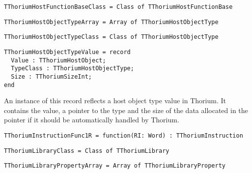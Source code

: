 \begin{verbatim}
TThoriumHostFunctionBaseClass = Class of TThoriumHostFunctionBase
\end{verbatim}
\label{thoriumcorepkg:thorium:tthoriumhostfunctionbaseclass}



\begin{verbatim}
TThoriumHostObjectTypeArray = Array of TThoriumHostObjectType
\end{verbatim}
\label{thoriumcorepkg:thorium:tthoriumhostobjecttypearray}



\begin{verbatim}
TThoriumHostObjectTypeClass = Class of TThoriumHostObjectType
\end{verbatim}
\label{thoriumcorepkg:thorium:tthoriumhostobjecttypeclass}



\begin{verbatim}
TThoriumHostObjectTypeValue = record
  Value : TThoriumHostObject;
  TypeClass : TThoriumHostObjectType;
  Size : TThoriumSizeInt;
end

\end{verbatim}
\label{thoriumcorepkg:thorium:tthoriumhostobjecttypevalue}
An instance of this record reflects a host object type value in Thorium. It contains the value, a pointer to the type and the size of the data allocated in the pointer if it should be automatically handled by Thorium.


\begin{verbatim}
TThoriumInstructionFunc1R = function(RI: Word) : TThoriumInstruction
\end{verbatim}
\label{thoriumcorepkg:thorium:tthoriuminstructionfunc1r}



\begin{verbatim}
TThoriumLibraryClass = Class of TThoriumLibrary
\end{verbatim}
\label{thoriumcorepkg:thorium:tthoriumlibraryclass}



\begin{verbatim}
TThoriumLibraryPropertyArray = Array of TThoriumLibraryProperty
\end{verbatim}
\label{thoriumcorepkg:thorium:tthoriumlibrarypropertyarray}



